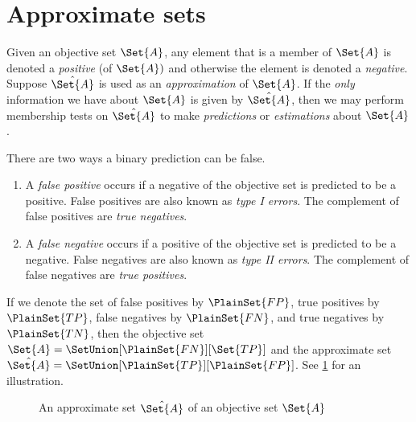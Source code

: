 \documentclass[ ../main.tex]{subfiles}
\begin{document}
\section{Approximate sets}
\label{sec:asets}
Given an objective set $\Set{A}$, any element that is a member of $\Set{A}$ is denoted a \emph{positive} (of $\Set{A})$ and otherwise the element is denoted a \emph{negative}.
Suppose $\hat{\Set{A}}$ is used as an \emph{approximation} of $\Set{A}$.
If the \emph{only} information we have about $\Set{A}$ is given by $\hat{\Set{A}}$, then we may perform membership tests on $\hat{\Set{A}}$ to make \emph{predictions} or \emph{estimations} about $\Set{A}$.

There are two ways a binary prediction can be false.
\begin{enumerate}
    \item A \emph{false positive} occurs if a negative of the objective set is predicted to be a positive.
    False positives are also known as \emph{type I errors}.
    The complement of false positives are \emph{true negatives}.
    \item A \emph{false negative} occurs if a positive of the objective set is predicted to be a negative. False negatives are also known as \emph{type II errors}.
    The complement of false negatives are \emph{true positives}.
\end{enumerate} 

If we denote the set of false positives by $\PlainSet{FP}$, true positives by $\PlainSet{TP}$, false negatives by $\PlainSet{FN}$, and true negatives by $\PlainSet{TN}$, then the objective set $\Set{A}=\SetUnion[\PlainSet{FN}][\Set{TP}]$ and the approximate set $\hat{\Set{A}}=\SetUnion[\PlainSet{TP}][\PlainSet{FP}]$.
See \cref{fig:ex_approx_set} for an illustration.
\begin{figure}[ht]
\caption{An approximate set $\hat{\Set{A}}$ of an objective set $\Set{A}$}
\label{fig:ex_approx_set}
\centering
\def\svgwidth{\columnwidth/4}

\end{figure}
\end{document}
